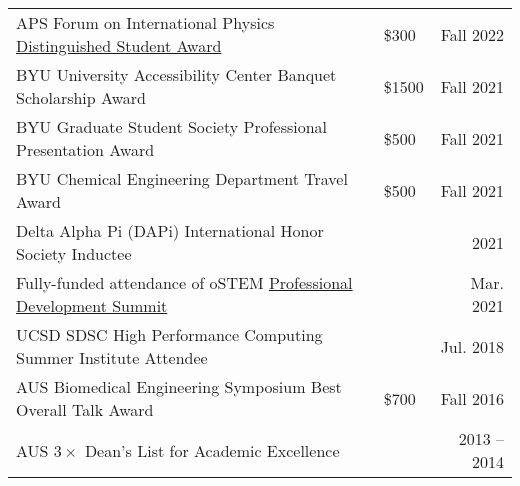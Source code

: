 \documentclass[letterpaper,11pt]{article}
\begin{document}
\begin{longtable}{@{}p{} p{} r@{}}
  APS Forum on International Physics \href{https://engage.aps.org/fip/honors/prizes-awards/ds-program}{Distinguished Student Award}                                                                                                   & \$300   & Fall 2022    \\[3pt] %
  BYU University Accessibility Center Banquet Scholarship Award                                                                                                                                                                       & \$1500  & Fall 2021    \\[3pt] %
  BYU Graduate Student Society Professional Presentation Award                                                                                                                                                                        & \$500   & Fall 2021    \\[3pt] %
  BYU Chemical Engineering Department Travel Award                                                                                                                                                                                    & \$500   & Fall 2021    \\[3pt] %
  Delta Alpha Pi (DAPi) International Honor Society Inductee                                                                                                                                                                          &         & 2021         \\[3pt]
  Fully-funded attendance of oSTEM \href{https://ostem.org/page/professional-development-summit}{Professional Development Summit}                                                                                                     &         & Mar. 2021    \\[3pt]
  UCSD SDSC High Performance Computing Summer Institute Attendee                                                                                                                                                                      &         & Jul. 2018    \\[3pt]
  AUS Biomedical Engineering Symposium Best Overall Talk Award                                                                                                                                                                        & \$700   & Fall 2016    \\[3pt]
  AUS $3\times$ Dean's List for Academic Excellence                                                                                                                                                                                   &         & 2013 -- 2014 \\
\end{longtable}
\end{document}
